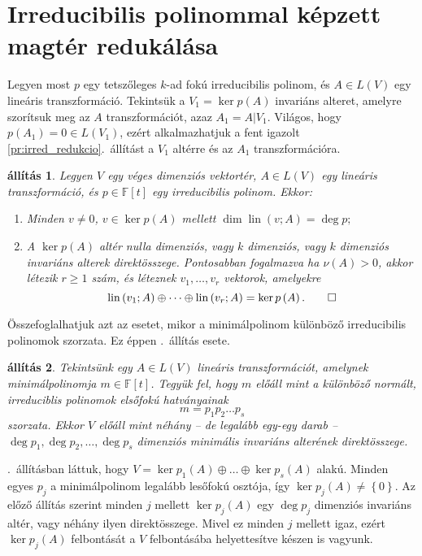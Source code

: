 \documentclass[9pt, a4paper, showtrims]{memoir}
\makeatletter
\let\Aref\relax
\renewenvironment{proof}[1][\proofname]
    {\par\pushQED{\qed}%
    \normalfont \topsep6\p@\@plus6\p@\relax
    \trivlist
    \item[\hskip\labelsep
        \itshape
    #1\@addpunct{:}]\ignorespaces}
    {\popQED\endtrivlist\@endpefalse}
\theoremstyle{plain}
\newtheorem{proposition}{állítás}[chapter]
\theoremstyle{remark}
\theoremstyle{definition}
\DeclareMathOperator{\lin}{lin}
\makeatother
\begin{document}
    \section{Irreducibilis polinommal képzett magtér redukálása}
    Legyen most $p$ egy tetszőleges $k$-ad fokú irreducibilis polinom,
    és $A\in L(V)$ egy lineáris transzformáció.
    Tekintsük a $V_1=\ker p\left( A \right)$ invariáns alteret, amelyre szorítsuk meg az $A$
    transzformációt, azaz $A_1=A|V_1$.
    Világos, hogy $p\left( A_1 \right)=0\in L\left( V_1 \right)$, 
    ezért alkalmazhatjuk a fent igazolt \ref{pr:irred_redukcio}.~állítást
    a $V_1$ altérre és az $A_1$ transzformációra.
    \begin{proposition}
        Legyen $V$ egy véges dimenziós vektortér, $A\in L\left( V \right)$ egy lineáris transzformáció,
        és $p\in\mathbb{F}\left[ t \right]$ egy irreducibilis polinom.
        Ekkor:
        \begin{enumerate}
            \item Minden $v\neq 0$, $v\in\ker p\left( A \right)$ mellett
                \(
                \dim\lin(v;A)=\deg p;
                \)
            \item A $\ker p\left( A \right)$ altér nulla dimenziós,
                vagy $k$ dimenziós, vagy $k$ dimenziós invariáns alterek direktösszege.
                Pontosabban fogalmazva
                ha $\nu\left( A \right)>0$, akkor létezik $r\geq 1$ szám,
                és léteznek $v_1,\dots,v_r$ vektorok, amelyekre
                \[
                    \lin\left( v_1;A \right)\oplus\dots\oplus \lin\left( v_r;A \right)
                    =
                    \ker p\left( A \right).
                    \qedhere
                \]
        \end{enumerate}
    \end{proposition}
    Összefoglalhatjuk azt az esetet, 
    mikor a minimálpolinom különböző irreducibilis polinomok szorzata.
    Ez éppen .~állítás esete.
    \begin{proposition}
        Tekintsünk egy $A\in L\left( V \right)$ lineáris transzformációt,
        amelynek minimálpolinomja $m\in\mathbb{F}\left[ t \right]$.
        Tegyük fel, 
        hogy $m$ előáll mint a különböző normált, irreduciblis polinomok elsőfokú hatványainak
        \[
            m=p_1p_2\dots p_s
        \]
        szorzata.
        Ekkor $V$ előáll mint néhány -- de legalább egy-egy darab --
        $\deg p_1,\deg p_2,\dots,\deg p_s$ dimenziós minimális invariáns alterének direktösszege.
    \end{proposition}
    \begin{proof}
        \Aref{pr:redukcio-primfelbontas}.~állításban láttuk, 
        hogy $V=\ker p_1\left( A \right)\oplus\dots\oplus\ker p_s\left( A \right)$ alakú.
        Minden egyes $p_j$ a minimálpolinom legalább lesőfokú osztója, így $\ker p_j\left( A \right)\neq\left\{ 0 \right\}$.
        Az előző állítás szerint minden $j$ mellett $\ker p_j\left( A \right)$ egy $\deg p_j$
        dimenziós invariáns altér, vagy néhány ilyen direktösszege.
        Mivel ez minden $j$ mellett igaz, ezért $\ker p_j\left( A \right)$ felbontását a $V$ felbontásába helyettesítve készen is vagyunk.
    \end{proof}
\end{document}
